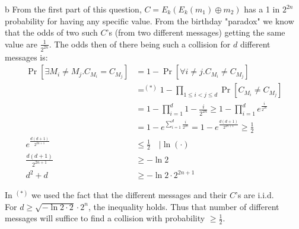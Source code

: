 \documentclass{article}
\begin{document}
\begin{paragraph}
    b From the first part of this question, $C = E_k(E_k(m_1) \oplus m_2)$ has a 1 in $2^{2n}$ probability for having any specific value. From the birthday "paradox" we know that the odds of two such $C$'s (from two different messages) getting the same value are $\frac{1}{2^{2n}}$. The odds then of there being such a collision for $d$ different messages is:
    \begin{align*}
        \Pr[\exists M_i \neq M_j. C_{M_i} = C_{M_j}] &= 1 - \Pr[\forall i \neq j. C_{M_i} \neq C_{M_j}]\\
        &=^{(*)} 1 - \prod\limits_{1 \leq i < j \leq d}\Pr[C_{M_i} \neq C_{M_j}]\\
        &= 1 - \prod\limits_{i = 1}^d 1 - \frac{i}{2^{2n}} \geq 1 - \prod\limits_{i = 1}^d e^{\frac{i}{2^{2n}}}\\
        &= 1 - e^{\sum\limits_{i = 1}^d\frac{i}{2^{2n}}} = 1 - e^{\frac{d (d + 1)}{2^{2n + 1}}} \geq \frac{1}{2}\\
        e^{\frac{d (d + 1)}{2^{2n + 1}}} &\leq \frac{1}{2} \quad |\ln (\cdot)\\
        \frac{d (d + 1)}{2^{2n + 1}} &\geq -\ln2\\
        d^2 + d &\geq -\ln2 \cdot 2^{2n+1}
    \end{align*}
    
    In $^{(*)}$ we used the fact that the different messages and their $C$'s are i.i.d.\\
    
    For $d \geq \sqrt{-\ln2 \cdot 2} \cdot 2^n$, the inequality holds. Thus that number of different messages will suffice to find a collision with probability $\geq \frac{1}{2}$.
\end{paragraph}
\end{document}
